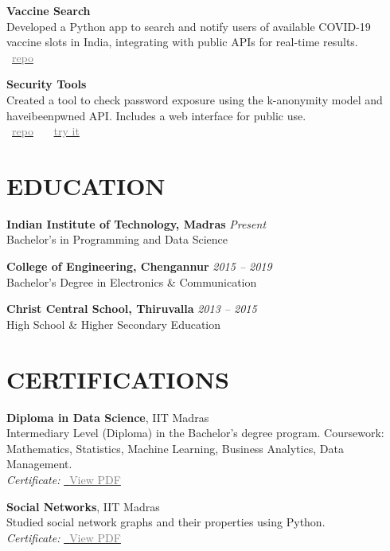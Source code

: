 \documentclass[11pt,a4paper]{article}
\begin{document}
\textbf{Vaccine Search} \\
Developed a Python app to search and notify users of available COVID-19 vaccine slots in India, integrating with public APIs for real-time results. \\
\faGithub~\href{https://github.com/jishnujp/vaccine_search}{\textcolor{gray}{repo}} 

\textbf{Security Tools} \\
Created a tool to check password exposure using the k-anonymity model and haveibeenpwned API. Includes a web interface for public use. \\
\faGithub~\href{https://github.com/jishnujp/securityTools}{\textcolor{gray}{repo}} \, \textbar{} \,
\faGlobe~\href{https://jishnujp.github.io/securityTools}{\textcolor{gray}{try it}} 

\section*{EDUCATION}
\textbf{Indian Institute of Technology, Madras} \hfill \textit{Present} \\
Bachelor's in Programming and Data Science

\textbf{College of Engineering, Chengannur} \hfill \textit{2015 -- 2019} \\
Bachelor's Degree in Electronics \& Communication

\textbf{Christ Central School, Thiruvalla} \hfill \textit{2013 -- 2015} \\
High School \& Higher Secondary Education

\section*{CERTIFICATIONS}
\textbf{Diploma in Data Science}, IIT Madras \\
Intermediary Level (Diploma) in the Bachelor's degree program. Coursework: Mathematics, Statistics, Machine Learning, Business Analytics, Data Management. \\
\textit{Certificate:} \href{https://jishnujp.github.io/certificates/data_science_diploma.pdf}{\faFilePdfO~\textcolor{gray}{View PDF}}

\textbf{Social Networks}, IIT Madras \\
Studied social network graphs and their properties using Python. \\
\textit{Certificate:} \href{https://archive.nptel.ac.in/content/noc/NOC22/SEM1/Ecertificates/106/noc22-cs30/Course/NPTEL22CS30S4373058402018648.jpg}{\faFilePdfO~\textcolor{gray}{View PDF}}
\end{document}
